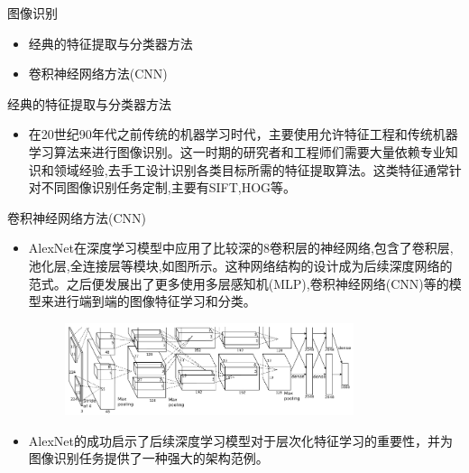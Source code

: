\documentclass[UTF8]{beamer}
\begin{document}
\begin{frame}{图像识别}
    \begin{itemize}
        \item 经典的特征提取与分类器方法
        \item 卷积神经网络方法(CNN)
        
    \end{itemize}
\end{frame}

\begin{frame}{经典的特征提取与分类器方法}
    \begin{itemize}
        \item 在20世纪90年代之前传统的机器学习时代，主要使用允许特征工程和传统机器学习算法来进行图像识别。这一时期的研究者和工程师们需要大量依赖专业知识和领域经验,去手工设计识别各类目标所需的特征提取算法。这类特征通常针对不同图像识别任务定制,主要有SIFT,HOG等。
    \end{itemize}
\end{frame}

\begin{frame}{卷积神经网络方法(CNN)}
    \scriptsize
    \begin{itemize}
        \item AlexNet在深度学习模型中应用了比较深的8卷积层的神经网络,包含了卷积层,池化层,全连接层等模块,如图所示。这种网络结构的设计成为后续深度网络的范式。之后便发展出了更多使用多层感知机(MLP),卷积神经网络(CNN)等的模型来进行端到端的图像特征学习和分类。

        \begin{figure}[H]
            \centering
            \includegraphics[width=0.8\textwidth]{img/2-Image Recognition/4.jpg}
        \end{figure}

        \item AlexNet的成功启示了后续深度学习模型对于层次化特征学习的重要性，并为图像识别任务提供了一种强大的架构范例。
    \end{itemize}
\end{frame}
\end{document}
